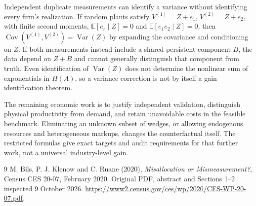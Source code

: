 \documentclass[11pt]{article}
\theoremstyle{remark}\newtheorem{remark}[theorem]{Remark}
\newcommand{\E}{\mathbb E}
\newcommand{\Var}{\operatorname{Var}}
\newcommand{\Cov}{\operatorname{Cov}}
\begin{document}
Independent duplicate measurements can identify a variance without identifying every firm's realization. If random plants satisfy $V^{(1)}=Z+e_1$, $V^{(2)}=Z+e_2$, with finite second moments, $\E[e_r\mid Z]=0$ and $\E[e_1e_2\mid Z]=0$, then
$\Cov(V^{(1)},V^{(2)})=\Var(Z)$ by expanding the covariance and conditioning on $Z$. If both measurements instead include a shared persistent component $B$, the data depend on $Z+B$ and cannot generally distinguish that component from truth. Even identification of $\Var(Z)$ does not determine the nonlinear sum of exponentials in $H(A)$, so a variance correction is not by itself a gain identification theorem.

The remaining economic work is to justify independent validation, distinguish physical productivity from demand, and retain unavoidable costs in the feasible benchmark. Eliminating an unknown subset of wedges, or allowing endogenous resources and heterogeneous markups, changes the counterfactual itself. The restricted formulas give exact targets and audit requirements for that further work, not a universal industry-level gain.

\begin{thebibliography}{9}
 M. Bils, P. J. Klenow and C. Ruane (2020), \emph{Misallocation or Mismeasurement?}, Census CES 20-07, February 2020. Original PDF, abstract and Sections 1--2 inspected 9 October 2026. \url{https://www2.census.gov/ces/wp/2020/CES-WP-20-07.pdf}.
\end{thebibliography}
\end{document}
